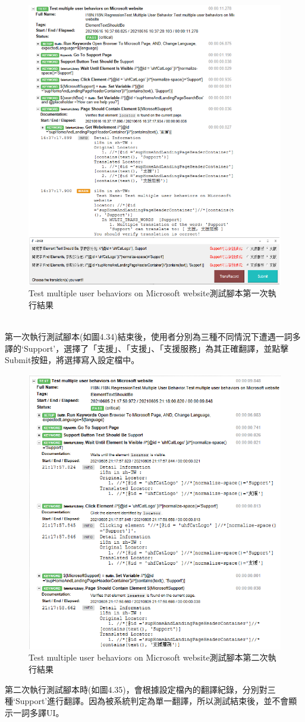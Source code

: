 \begin{figure}[H]
\includegraphics[width= 1.1\textwidth]{../論文截圖/4-4-2 test multiple user behaviors測試腳本1st run.png}
\caption{Test multiple user behaviors on Microsoft website測試腳本第一次執行結果}
\end{figure}
\hspace*{\fill} \\

第一次執行測試腳本(如圖4.34)結束後，使用者分別為三種不同情況下遭遇一詞多譯的‘Support’，選擇了「支援」、「支援」、「支援服務」為其正確翻譯，並點擊Submit按鈕，將選擇寫入設定檔中。

\begin{figure}[H]
\centering
\includegraphics[width= .85\textwidth]{../論文截圖/4-4-3 test multiple user behaviors測試腳本2nd run.png}
\caption{Test multiple user behaviors on Microsoft website測試腳本第二次執行結果}
\end{figure}

第二次執行測試腳本時(如圖4.35)，會根據設定檔內的翻譯紀錄，分別對三種‘Support’進行翻譯。因為被系統判定為單一翻譯，所以測試結束後，並不會顯示一詞多譯UI。
